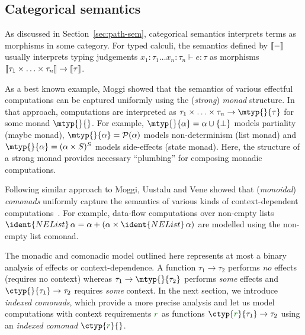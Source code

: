 
\subsection{Categorical semantics}

As discussed in Section~\ref{sec:path-sem}, categorical semantics interprets terms as morphisms
in some category. For typed calculi, the semantics defined by $\llbracket - \rrbracket$ usually interprets typing 
judgements $x_1 \!:\! \tau_1 \ldots x_n \!:\! \tau_n \vdash e: \tau$ as morphisms 
$\llbracket \tau_1 \times \ldots \times \tau_n \rrbracket \rightarrow \llbracket \tau \rrbracket$.

As a best known example, Moggi \cite{monad-notions} showed that the semantics of various effectful 
computations can be captured uniformly using the (\emph{strong}) \emph{monad} structure. In that 
approach, computations are interpreted as $\tau_1 \times \ldots \times \tau_n \rightarrow \mtyp{}{\tau}$
for some monad $\mtyp{}{}$. For example, $\mtyp{}{\alpha} = \alpha \cup \{ \bot \}$ models 
partiality (maybe monad), $\mtyp{}{\alpha} = \mathcal{P}(\alpha)$ models non-determinism (list 
monad) and $\mtyp{}{\alpha} = (\alpha \times S)^S$ models side-effects (state monad). Here, the 
structure of a strong monad provides necessary ``plumbing'' for composing monadic computations.

Following similar approach to Moggi, Uustalu and Vene \cite{comonads-notions} showed that 
(\emph{monoidal}) \emph{comonads} uniformly capture the semantics of various kinds of context-dependent 
computations~\cite{comonads-notions}. For example, data-flow computations over non-empty lists
$\ident{NEList}\,\alpha = \alpha + (\alpha \times \ident{NEList}\,\alpha)$ are modelled using
the non-empty list comonad.

The monadic and comonadic model outlined here represents at most a binary analysis of effects or 
context-dependence. A function $\tau_1 \rightarrow \tau_2$ performs \emph{no} effects (requires no 
context) whereas $\tau_1 \rightarrow \mtyp{}{\tau_2}$ performs \emph{some} effects and
$\ctyp{}{\tau_1} \rightarrow \tau_2$ requires \emph{some} context. In the next section, we introduce
\emph{indexed comonads}, which provide a more precise analysis and let us model computations with
context requirements $\cclrd{r}$ as functions $\ctyp{\cclrd{r}}{\tau_1} \rightarrow \tau_2$ using
an \emph{indexed comonad} $\ctyp{\cclrd{r}}{}$.

